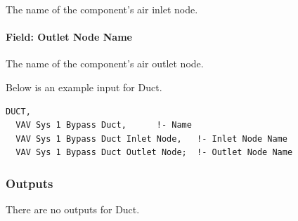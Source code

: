 The name of the component's air inlet node.

\paragraph{Field: Outlet Node Name}\label{field-outlet-node-name-2-000}

The name of the component's air outlet node.

Below is an example input for Duct.

\begin{lstlisting}
DUCT,
  VAV Sys 1 Bypass Duct,      !- Name
  VAV Sys 1 Bypass Duct Inlet Node,   !- Inlet Node Name
  VAV Sys 1 Bypass Duct Outlet Node;  !- Outlet Node Name
\end{lstlisting}

\subsubsection{Outputs}\label{outputs-10-004}

There are no outputs for Duct.
